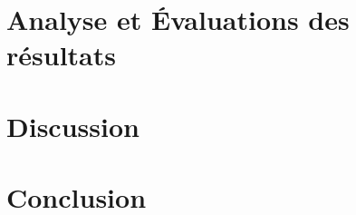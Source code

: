 \documentclass[leqno]{article}[12pt]
\begin{document}
    \thispagestyle{firstpagestyle}

    \newpage
    \setcounter{page}{1} %

    \newpage
    \section{Analyse et Évaluations des résultats}\label{sec:results}
    

    \newpage
    \section{Discussion}\label{sec:discussion}
    

    \vfill
    \section{Conclusion}\label{sec:conclusion}
    
\end{document}

